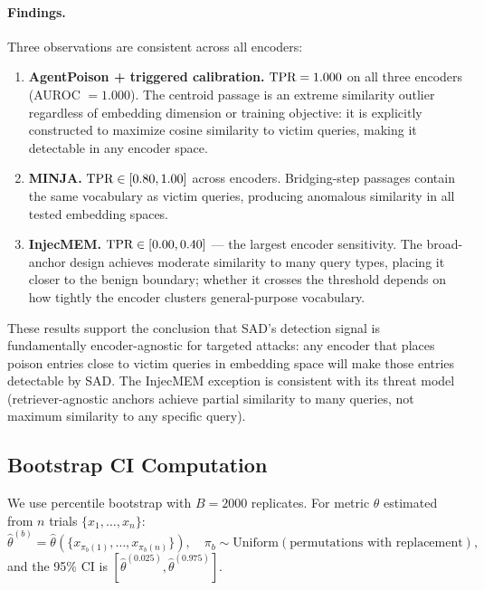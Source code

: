 \paragraph{Findings.}
Three observations are consistent across all encoders:
\begin{enumerate}
  \item \textbf{AgentPoison + triggered calibration.}  $\text{TPR} = 1.000$ on all
  three encoders (AUROC $= 1.000$).  The centroid passage is an extreme
  similarity outlier regardless of embedding dimension or training objective:
  it is explicitly constructed to maximize cosine similarity to victim queries,
  making it detectable in any encoder space.
  \item \textbf{MINJA.}  $\text{TPR} \in [0.80, 1.00]$ across encoders.  Bridging-step
  passages contain the same vocabulary as victim queries, producing anomalous
  similarity in all tested embedding spaces.
  \item \textbf{InjecMEM.}  $\text{TPR} \in [0.00, 0.40]$ — the largest encoder
  sensitivity.  The broad-anchor design achieves moderate similarity to many
  query types, placing it closer to the benign boundary; whether it crosses the
  threshold depends on how tightly the encoder clusters general-purpose
  vocabulary.
\end{enumerate}

These results support the conclusion that SAD's detection signal is
fundamentally encoder-agnostic for targeted attacks: any encoder that places
poison entries close to victim queries in embedding space will make those
entries detectable by SAD.  The InjecMEM exception is consistent with its
threat model (retriever-agnostic anchors achieve partial similarity to many
queries, not maximum similarity to any specific query).

\subsection{Bootstrap CI Computation}
\label{sec:bootstrap}

We use percentile bootstrap with $B=2000$ replicates.  For metric $\theta$
estimated from $n$ trials $\{x_1, \ldots, x_n\}$:
\begin{equation}
  \hat{\theta}^{(b)} = \hat{\theta}(\{x_{\pi_b(1)}, \ldots, x_{\pi_b(n)}\}),
  \quad \pi_b \sim \mathrm{Uniform}(\text{permutations with replacement}),
\end{equation}
and the 95\% CI is $[\hat{\theta}^{(0.025)}, \hat{\theta}^{(0.975)}]$.
